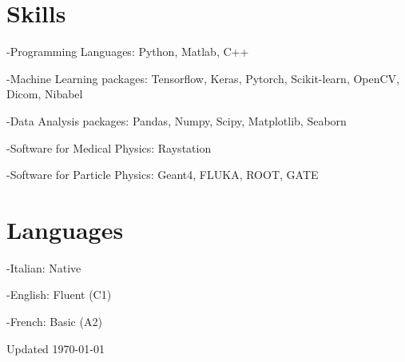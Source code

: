 \documentclass[11pt,letterpaper]{report}
\newcommand{\listitemspace}{0.25em}
\renewenvironment{itemize}
{\begin{list}{}{\setlength{\leftmargin}{0em}
                \setlength{\parskip}{0em}
                \setlength{\itemsep}{\listitemspace}
                \setlength{\parsep}{\listitemspace}}}
{\end{list}}
\begin{document}
    \section*{Skills}
    \begin{itemize}
        \item -Programming Languages: Python, Matlab, C++
        \item -Machine Learning packages: Tensorflow, Keras, Pytorch, 
        Scikit-learn, OpenCV, Dicom, Nibabel
        
        
        \item -Data Analysis packages: Pandas, Numpy, Scipy, Matplotlib, 
        Seaborn
        \item -Software for Medical Physics: Raystation
        
        \item -Software for Particle Physics: Geant4, FLUKA, ROOT, GATE 
    \end{itemize}

    \section*{Languages}
    \begin{itemize}
        \item -Italian: Native
        \item -English: Fluent (C1)
        \item -French: Basic (A2)
    \end{itemize}


%
%
%
%


    \begin{center}
        \vfill
        Updated \monthyeardate\today
    \end{center}
\end{document}
